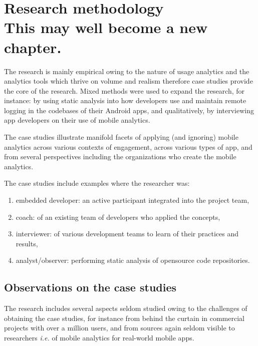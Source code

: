 
\clearpage
\section[Research methodology]{Research methodology \\ \small{This may well become a new chapter.}}
The research is mainly empirical owing to the nature of usage analytics and the analytics tools which thrive on volume and realism therefore case studies provide the core of the research. Mixed methods were used to expand the research, for instance: by using static analysis into how developers use and maintain remote logging in the codebases of their Android apps, and qualitatively, by interviewing app developers on their use of mobile analytics. 

The case studies illustrate manifold facets of applying (and ignoring) mobile analytics across various contexts of engagement, across various types of app, and from several perspectives including the organizations who create the mobile analytics.

The case studies include examples where the researcher was:
\begin{enumerate}
    \itemsep0em
    \item embedded developer: an active participant integrated into the project team,
    \item coach: of an existing team of developers who applied the concepts,
    \item interviewer: of various development teams to learn of their practices and results,
    \item analyst/observer: performing static analysis of opensource code repositories.
\end{enumerate}

\clearpage


\subsection{Observations on the case studies}
The research includes several aspects seldom studied owing to the challenges of obtaining the case studies, for instance from behind the curtain in commercial projects with over a million users, and from sources again seldom visible to researchers \emph{i.e.} of mobile analytics for real-world mobile apps.



